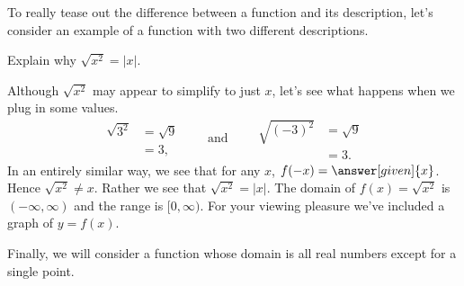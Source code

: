 \documentclass{ximera}
\begin{document}
To really tease out the difference between a function and its
description, let's consider an example of a function with two
different descriptions.

\begin{example}
  Explain why $\sqrt{x^2} = |x|$.
  \begin{explanation}
    Although $\sqrt{x^2}$ may appear to simplify to just $x$, let's see
    what happens when we plug in some values.
    \[
    \begin{aligned}
    \sqrt{3^2} &= \sqrt{9}\\
    &=3,
    \end{aligned}
    \qquad\text{and}\qquad
    \begin{aligned}
      \sqrt{(-3)^2} &= \sqrt{9}\\
      &=3.
    \end{aligned}
    \]
    In an entirely similar way, we see that for any $x$, $f(-x)=\answer[given]{x}$.  Hence
    $\sqrt{x^2}\ne x$. Rather we see that $\sqrt{x^2} = |x|$.  The
    domain of $f(x)=\sqrt{x^2}$ is $(-\infty,\infty)$ and the range is
    $[0,\infty)$.  For your viewing pleasure we've included a graph of
      $y=f(x)$.
    \begin{image}
    \end{image}
  \end{explanation}
\end{example}

Finally, we will consider a function whose domain is all real numbers
except for a single point.
\end{document}
